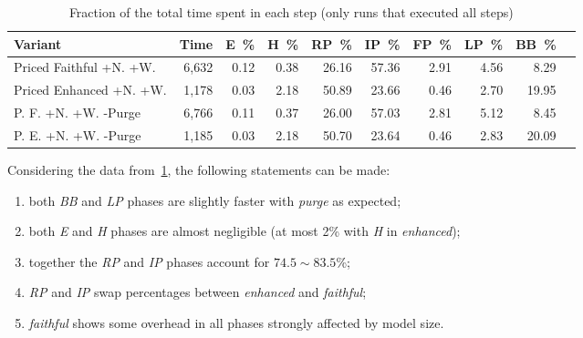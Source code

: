 \documentclass[ppgc,tese,english,formais,babel]{iiufrgs}
\begin{document}
\begin{table}
\centering
{}
\caption{Fraction of the total time spent in each step (only runs that executed all steps)}
\begin{tabular}{lrrrrrrrrr}
\hline\hline
Variant & Time & E~\% & H~\% & RP~\% & IP~\% & FP~\% & LP~\% & BB~\% \\\hline
Priced Faithful +N. +W. & 6,632 & 0.12 & 0.38 & 26.16 & 57.36 & 2.91 & 4.56 & 8.29 \\
Priced Enhanced +N. +W. & 1,178 & 0.03 & 2.18 & 50.89 & 23.66 & 0.46 & 2.70 & 19.95 \\
P. F. +N. +W. -Purge & 6,766 & 0.11 & 0.37 & 26.00 & 57.03 & 2.81 & 5.12 & 8.45 \\
P. E. +N. +W. -Purge & 1,185 & 0.03 & 2.18 & 50.70 & 23.64 & 0.46 & 2.83 & 20.09 \\\hline\hline
\end{tabular}
\label{tab:time_fractions}
\end{table}

Considering the data from~\cref{tab:time_fractions}, the following statements can be made:
\begin{enumerate}
\item both \emph{BB} and \emph{LP} phases are slightly faster with \emph{purge} as expected;
\item both \emph{E} and \emph{H} phases are almost negligible (at most 2\% with \emph{H} in \emph{enhanced});
\item together the \emph{RP} and \emph{IP} phases account for \(74.5\sim83.5\)\%;
\item \emph{RP} and \emph{IP} swap percentages between \emph{enhanced} and \emph{faithful};
\item \emph{faithful} shows some overhead in all phases strongly affected by model size.
\end{enumerate}
\end{document}
